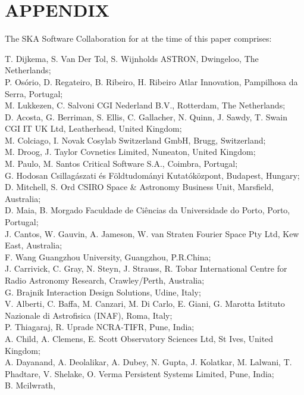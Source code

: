 \documentclass[a4paper,
               biblatex,     %
               keeplastbox,   %
               ]{jacow}
\begin{document}
\section{APPENDIX}
The SKA Software Collaboration for at the time of this paper comprises:

T. Dijkema,
S. Van Der Tol,
S. Wijnholds ASTRON, Dwingeloo, The Netherlands;\\
P. Osório,
D. Regateiro,
B. Ribeiro,
H. Ribeiro Atlar Innovation, Pampilhosa da Serra, Portugal;\\
M. Lukkezen,
C. Salvoni CGI Nederland B.V., Rotterdam, The Netherlands;\\
D. Acosta,
G. Berriman,
S. Ellis,
C. Gallacher,
N. Quinn,
J. Sawdy,
T. Swain CGI IT UK Ltd, Leatherhead, United Kingdom;\\
M. Colciago,
I. Novak Cosylab Switzerland GmbH, Brugg, Switzerland;\\
M. Droog,
J. Taylor Covnetics Limited, Nuneaton, United Kingdom;\\
M. Paulo,
M. Santos Critical Software S.A., Coimbra, Portugal;\\
G. Hodosan Csillagászati és Földtudományi Kutatóközpont, Budapest, Hungary;\\
D. Mitchell,
S. Ord CSIRO Space \& Astronomy Business Unit, Marsfield, Australia;\\
D. Maia,
B. Morgado Faculdade de Ciências da Universidade do Porto, Porto, Portugal;\\
J. Cantos,
W. Gauvin,
A. Jameson,
W. van Straten Fourier Space Pty Ltd, Kew East, Australia;\\
F. Wang Guangzhou University, Guangzhou, P.R.China;\\
J. Carrivick,
C. Gray,
N. Steyn,
J. Strauss,
R. Tobar International Centre for Radio Astronomy Research, Crawley/Perth, Australia;\\
G. Brajnik Interaction Design Solutions, Udine, Italy;\\
V. Alberti,
C. Baffa,
M. Canzari,
M. Di Carlo,
E. Giani,
G. Marotta Istituto Nazionale di Astrofisica (INAF), Roma, Italy;\\
P. Thiagaraj,
R. Uprade NCRA-TIFR, Pune, India;\\
A. Child,
A. Clemens,
E. Scott Observatory Sciences Ltd, St Ives, United Kingdom;\\
A. Dayanand,
A. Deolalikar,
A. Dubey,
N. Gupta,
J. Kolatkar,
M. Lalwani,
T. Phadtare,
V. Shelake,
O. Verma Persistent Systems Limited, Pune, India;\\
B. Mcilwrath,
\end{document}
